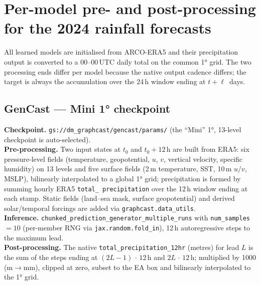 \documentclass[11pt]{article}
\newcommand{\code}[1]{\texttt{\small #1}}
\begin{document}
\section{Per-model pre- and post-processing for the 2024 rainfall forecasts}
\label{sec:models-detail}

All learned models are initialised from ARCO-ERA5 and their precipitation output
is converted to a 00--00\,UTC daily total on the common \ang{1} grid. The two
processing ends differ per model because the native output cadence differs; the
target is always the accumulation over the 24\,h window ending at
$t+\ell$~days.

\subsection{GenCast --- Mini \ang{1} checkpoint}
\textbf{Checkpoint.} \code{gs://dm\_graphcast/gencast/params/} (the ``Mini''
\ang{1}, 13-level checkpoint is auto-selected).\\
\textbf{Pre-processing.} Two input states at $t_0$ and $t_0{+}12$\,h are built
from ERA5: six pressure-level fields (temperature, geopotential, $u$, $v$,
vertical velocity, specific humidity) on 13 levels and five surface fields
(2\,m temperature, SST, 10\,m $u/v$, MSLP), bilinearly interpolated to a global
\ang{1} grid; precipitation is formed by summing hourly ERA5 \code{total\_%
precipitation} over the 12\,h window ending at each stamp. Static fields
(land--sea mask, surface geopotential) and derived solar/temporal forcings are
added via \code{graphcast.data\_utils}.\\
\textbf{Inference.} \code{chunked\_prediction\_generator\_multiple\_runs} with
\code{num\_samples}${=}10$ (per-member RNG via \code{jax.random.fold\_in}),
12\,h autoregressive steps to the maximum lead.\\
\textbf{Post-processing.} The native \code{total\_precipitation\_12hr} (metres)
for lead $L$ is the sum of the steps ending at $(2L{-}1)\,{\cdot}\,12$\,h and
$2L\,{\cdot}\,12$\,h; multiplied by 1000 (m$\to$mm), clipped at zero, subset to
the EA box and bilinearly interpolated to the \ang{1} grid.

\end{document}
